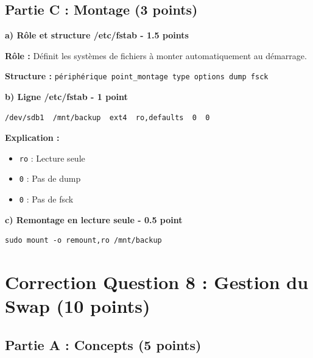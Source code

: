 \documentclass[12pt,a4paper]{article}
\begin{document}
\subsection*{Partie C : Montage (3 points)}

\begin{answerbox}
\textbf{a) Rôle et structure /etc/fstab - 1.5 points}

\textbf{Rôle :} Définit les systèmes de fichiers à monter automatiquement au démarrage.

\textbf{Structure :} \texttt{périphérique point\_montage type options dump fsck}

\textbf{b) Ligne /etc/fstab - 1 point}
\begin{verbatim}
/dev/sdb1  /mnt/backup  ext4  ro,defaults  0  0
\end{verbatim}

\textbf{Explication :}
\begin{itemize}
    \item \texttt{ro} : Lecture seule
    \item \texttt{0} : Pas de dump
    \item \texttt{0} : Pas de fsck
\end{itemize}

\textbf{c) Remontage en lecture seule - 0.5 point}
\begin{lstlisting}
sudo mount -o remount,ro /mnt/backup
\end{lstlisting}
\end{answerbox}

\newpage


\section{Correction Question 8 : Gestion du Swap (10 points)}

\subsection*{Partie A : Concepts (5 points)}
\end{document}
